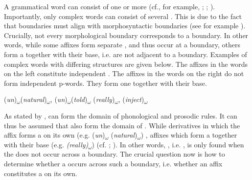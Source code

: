  A grammatical word can consist of one or more  (cf., for example, \citealt[29]{Booij.1983b}; \citealt[267]{Booij.1985}; \citealt[2]{Hall.2001}). Importantly, only complex words can consist of several . This is due to the fact that  boundaries must align with morphosyntactic boundaries (see for example \citealt[2]{Hall.2001}). Crucially, not every morphological boundary corresponds to a  boundary. In other words, while some affixes form separate , and thus occur at a  boundary, others form a  together with their base, i.e. are not adjacent to a  boundary. 
Examples of complex words with differing  structures are given below. The affixes in the words on the left constitute independent . The affixes in the words on the right do not form independent p-words. They form one  together with their base. 

\begin{multicols}{2}

\begin{exe}
		\centering	
	\ex (\textit{un})\textsubscript{$\omega$}(\textit{natural})\textsubscript{$\omega$}, (\textit{un})\textsubscript{$\omega$}(\textit{told})\textsubscript{$\omega$}
\columnbreak
	\ex (\textit{really})\textsubscript{$\omega$}, (\textit{inject})\textsubscript{$\omega$}
\end{exe}

\end{multicols}



As stated by \citet[3]{Hall.2001},  can form the domain of phonological and prosodic rules. It can thus be assumed that  also form the domain of . While derivatives in which the affix forms a  on its own (e.g. (\textit{un})\textsubscript{$\omega$} (\textit{natural})\textsubscript{$\omega$}) , affixes which form a  together with their base (e.g. \textit{(really)}\textsubscript{$\omega$})  (cf. \citealt[3543]{Giegerich.2012}; \citealt{Bergmann.}). In other words, , i.e. , is only found when the  does not occur across a  boundary. The crucial question now is how to determine whether a  occurs across such a boundary, i.e. whether an affix constitutes a  on its own.



